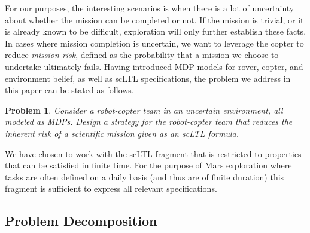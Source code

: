 \documentclass[conference]{IEEEtran}
\newtheorem{problem}{Problem}
\begin{document}
For our purposes, the interesting scenarios is when there is a lot of uncertainty about whether the mission can be completed or not. If the mission is trivial, or it is already known to be difficult, exploration will only further establish these facts. In cases where mission completion is uncertain, we want to leverage the copter to reduce \emph{mission risk}, defined as the probability that a mission we choose to undertake ultimately fails. Having introduced MDP models for rover, copter, and environment belief, as well as scLTL specifications, the problem we address in this paper can be stated as follows.

\begin{problem}
\label{prob:basic}
Consider a robot-copter team in an uncertain environment, all modeled as MDPs. Design a strategy for the robot-copter team that reduces the inherent risk of a scientific mission given as an scLTL formula.
\end{problem}

We have chosen to work with the scLTL fragment that is restricted to properties that can be satisfied in finite time. For the purpose of Mars exploration where tasks are often defined on a daily basis (and thus are of finite duration) this fragment is sufficient to express all relevant specifications.

\subsection{Problem Decomposition}
\end{document}
